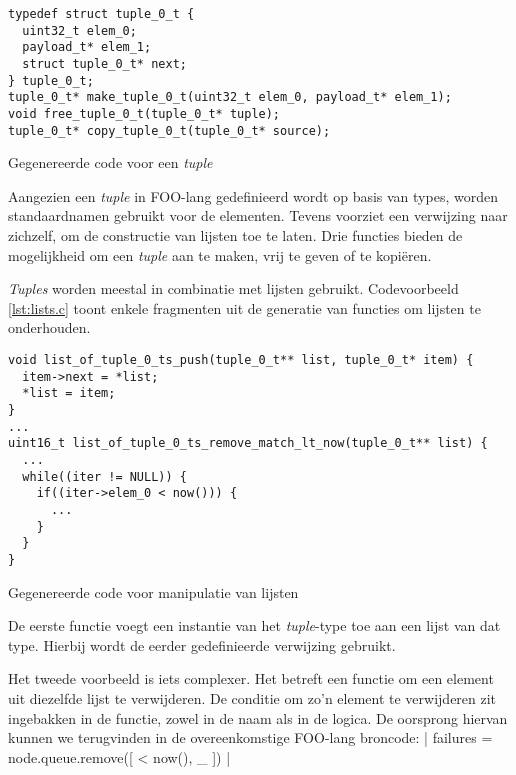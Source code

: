 \begin{listing}[ht]
  \begin{verbatim}
typedef struct tuple_0_t {
  uint32_t elem_0;
  payload_t* elem_1;
  struct tuple_0_t* next;
} tuple_0_t;
tuple_0_t* make_tuple_0_t(uint32_t elem_0, payload_t* elem_1);
void free_tuple_0_t(tuple_0_t* tuple);
tuple_0_t* copy_tuple_0_t(tuple_0_t* source);
  \end{verbatim}
  \vspace{-5mm}
  \caption{Gegenereerde code voor een \emph{tuple}}
  \label{lst:tuples.h}
\end{listing}

Aangezien een \emph{tuple} in FOO-lang gedefinieerd wordt op basis van types,
worden standaardnamen gebruikt voor de elementen. Tevens voorziet een
verwijzing naar zichzelf, om de constructie van lijsten toe te laten. Drie
functies bieden de mogelijkheid om een \emph{tuple} aan te maken, vrij te geven
of te kopi\"eren.

\emph{Tuples} worden meestal in combinatie met lijsten gebruikt. Codevoorbeeld
\ref{lst:lists.c} toont enkele fragmenten uit de generatie van functies om lijsten
te onderhouden.

\begin{listing}[ht]
  \begin{verbatim}
void list_of_tuple_0_ts_push(tuple_0_t** list, tuple_0_t* item) {
  item->next = *list;
  *list = item;
}
...
uint16_t list_of_tuple_0_ts_remove_match_lt_now(tuple_0_t** list) {
  ...
  while((iter != NULL)) {
    if((iter->elem_0 < now())) {
      ...
    }
  }
}
  \end{verbatim}
  \vspace{-5mm}
  \caption{Gegenereerde code voor manipulatie van lijsten}
  \label{lst:lists.c}
\end{listing}

De eerste functie voegt een instantie van het \emph{tuple}-type toe aan een
lijst van dat type. Hierbij wordt de eerder gedefinieerde verwijzing gebruikt.

Het tweede voorbeeld is iets complexer. Het betreft een functie om een element
uit diezelfde lijst te verwijderen. De conditie om zo'n element te verwijderen
zit ingebakken in de functie, zowel in de naam als in de logica. De oorsprong
hiervan kunnen we terugvinden in de overeenkomstige FOO-lang broncode:
| failures = node.queue.remove([ < now(), _ ]) |

